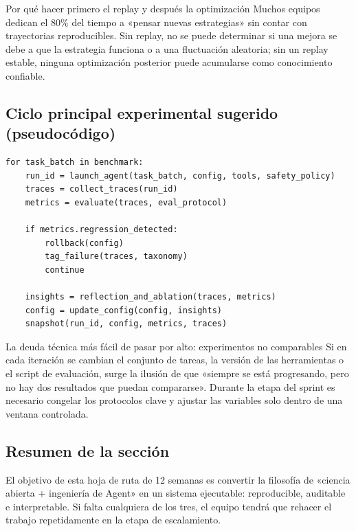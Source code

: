 \documentclass[a4paper]{article}
\begin{document}
\begin{knowledgebox}{Por qué hacer primero el replay y después la optimización}
Muchos equipos dedican el 80\% del tiempo a «pensar nuevas estrategias» sin contar con trayectorias reproducibles.  
Sin replay, no se puede determinar si una mejora se debe a que la estrategia funciona o a una fluctuación aleatoria; sin un replay estable, ninguna optimización posterior puede acumularse como conocimiento confiable.
\end{knowledgebox}

\subsection{Ciclo principal experimental sugerido (pseudocódigo)}
\begin{lstlisting}[caption={Research Loop: ciclo principal de iteración reproducible de Agent},label={lst:research-loop}]
for task_batch in benchmark:
    run_id = launch_agent(task_batch, config, tools, safety_policy)
    traces = collect_traces(run_id)
    metrics = evaluate(traces, eval_protocol)

    if metrics.regression_detected:
        rollback(config)
        tag_failure(traces, taxonomy)
        continue

    insights = reflection_and_ablation(traces, metrics)
    config = update_config(config, insights)
    snapshot(run_id, config, metrics, traces)
\end{lstlisting}

\begin{warningbox}{La deuda técnica más fácil de pasar por alto: experimentos no comparables}
Si en cada iteración se cambian el conjunto de tareas, la versión de las herramientas o el script de evaluación, surge la ilusión de que «siempre se está progresando, pero no hay dos resultados que puedan compararse».  
Durante la etapa del sprint es necesario congelar los protocolos clave y ajustar las variables solo dentro de una ventana controlada.
\end{warningbox}

\subsection{Resumen de la sección}
El objetivo de esta hoja de ruta de 12 semanas es convertir la filosofía de «ciencia abierta + ingeniería de Agent» en un sistema ejecutable: reproducible, auditable e interpretable. Si falta cualquiera de los tres, el equipo tendrá que rehacer el trabajo repetidamente en la etapa de escalamiento.
\end{document}
